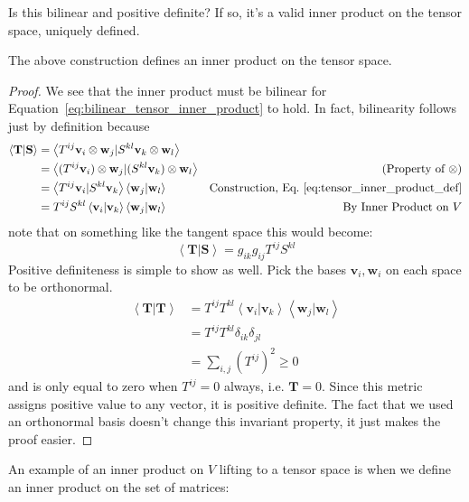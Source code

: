 	Is this bilinear and positive definite? If so, it's a valid inner product on the tensor space, uniquely defined.
	\begin{prop}
		The above construction defines an inner product on the tensor space.
	\end{prop} 
	\begin{proof}
		We see that the inner product must be bilinear for Equation~\eqref{eq:bilinear_tensor_inner_product} to hold. In fact, bilinearity follows just by definition because
		\begin{align*}
			\left< \mathbf{T} | \mathbf{S} \right> 
			&= \left< T^{ij} \mathbf v_i \otimes \mathbf w_j | S^{kl} \mathbf v_k \otimes \mathbf w_l \right> & \\
			&= \left< (T^{ij} \mathbf v_i) \otimes \mathbf w_j | (S^{kl} \mathbf v_k) \otimes \mathbf w_l \right>  & \text{(Property of $\otimes$)}\\
			& =\left< T^{ij} \mathbf v_i | S^{kl} \mathbf v_k \right> \left< \mathbf w_j | \mathbf w_l \right> & \text{Construction, Eq.~\eqref{eq:tensor_inner_product_def}}\\
			& = T^{ij} S^{kl} \left< \mathbf v_i | \mathbf v_k \right> \left< \mathbf w_j | \mathbf w_l \right> & \text{By Inner Product on $V$}
		\end{align*}
		note that on something like the tangent space this would become:
		\begin{equation}
			\left< \mathbf{T} | \mathbf{S} \right> = g_{ik} g_{ij} T^{ij} S^{kl}
		\end{equation}
		Positive definiteness is simple to show as well. Pick the bases $\mathbf v_i, \mathbf w_i$ on each space to be orthonormal. 
		\begin{align*}
			\left< \mathbf{T} | \mathbf{T} \right> 
			&= T^{ij} T^{kl} \left< \mathbf v_i | \mathbf v_k \right> \left< \mathbf w_j | \mathbf w_l \right> \\
			&= T^{ij} T^{kl} \delta_{ik} \delta_{jl} \\
			&= \sum_{i, j} (T^{ij})^2 \geq 0
		\end{align*}
		and is only equal to zero when $T^{ij}=0$ always, i.e. $\mathbf T = 0$. Since this metric assigns positive value to any vector, it is positive definite. The fact that we used an orthonormal basis doesn't change this invariant property, it just makes the proof easier. 
	\end{proof}
	An example of an inner product on $V$ lifting to a tensor space is when we define an inner product on the set of matrices:
